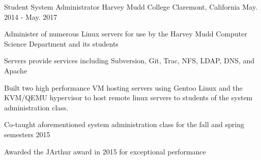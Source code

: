 \begin{cventries}
  \cventry
    {Student System Administrator} %
    {
      \hspace{0.7em}
      Harvey Mudd College
    } %
    {Claremont, California} %
    {May. 2014 - May. 2017} %
    {
      \begin{cvitems} %
        \item {Administer of numerous Linux servers for use by the Harvey Mudd Computer Science Department and its students}
        \item {Servers provide services including Subversion, Git, Trac, NFS, LDAP, DNS, and Apache}
        \item {
          Built two high performance VM hosting servers using Gentoo Linux and
          the KVM/QEMU hypervisor to host remote linux servers to students of
          the system administration class.
        }
        \item{Co-taught aforementioned system administration class for the fall and spring semesters 2015}
        \item{Awarded the JArthur award in 2015 for exceptional performance}
      \end{cvitems}
    }

\end{cventries}
